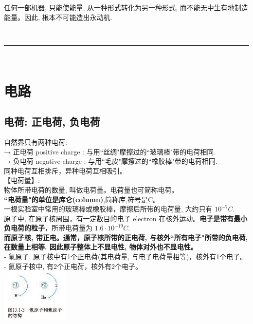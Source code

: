 \documentclass[UTF8]{ctexart}
\begin{document}
	任何一部机器, 只能使能量, 从一种形式转化为另一种形式, 而不能无中生有地制造能量。因此, 根本不可能造出永动机.
	
	~\\
	\hrule
	~\\
	
	
	\section{电路}
	
	\subsection{电荷: 正电荷, 负电荷}
	
	自然界只有两种电荷: \\
	→ 正电荷 positive charge : 与用``丝绸"摩擦过的``玻璃棒"带的电荷相同. \\
	→ 负电荷 negative charge : 与用``毛皮"摩擦过的``橡胶棒"带的电荷相同. \\
	
	同种电荷互相排斥，异种电荷互相吸引。\\
	
	
	【电荷量】: \\	
	物体所带电荷的数量, 叫做电荷量。电荷量也可简称电荷。 \\
	\textbf{``电荷量"的单位是库仑(column)},简称库,符号是C。\\
	一根实验室中常用的玻璃棒或橡胶棒，摩擦后所带的电荷量, 大约只有 $10^{-7} C$. \\
	
	原子中, 在原子核周围，有一定数目的电子 electron 在核外运动。\textbf{电子是带有最小负电荷的粒子}，所带电荷量为 $1.6 \cdot 10^{-19} C$. \\
	\textbf{而原子核, 带正电。\textbf{通常，原子核所带的正电荷, 与核外``所有电子"所带的负电荷, 在数量上相等. 因此原子整体上不显电性, 物体对外也不显电性。}} \\
	
	- 氢原子, 原子核中有1个正电荷(其电荷量, 与电子电荷量相等)，核外有1个电子。 \\
	- 氦原子核中, 有2个正电荷，核外有2个电子。 \\
	
	\includegraphics[width=0.25\textwidth]{img/0051.png} \\
	
\end{document}
